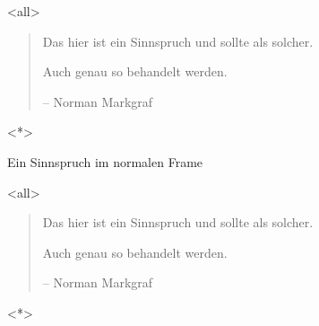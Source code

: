 \documentclass[ignorenonframetext,]{beamer}
\begin{document}
\mode<all>\begin{quote}\small 

Das hier ist ein Sinnspruch und sollte als solcher.

Auch genau so behandelt werden.

{{\scriptsize – Norman Markgraf}}

\end{quote}
\mode<*>

\begin{frame}{%
\protect\hypertarget{ein-sinnspruch-im-normalen-frame}{%
Ein Sinnspruch im normalen Frame}}


\mode<all>\begin{quote}\small 

Das hier ist ein Sinnspruch und sollte als solcher.

Auch genau so behandelt werden.

{{\scriptsize – Norman Markgraf}}

\end{quote}
\mode<*>

\end{frame}
\end{document}
